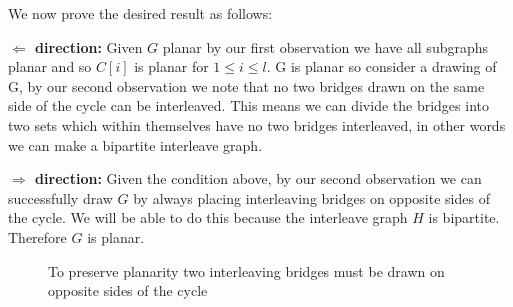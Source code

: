 \documentclass[a4paper]{article}
\begin{document}
\vspace{\baselineskip}
We now prove the desired result as follows:

\vspace{\baselineskip}
\textbf{$\Leftarrow$ direction:} Given $G$ planar by our first observation we have all subgraphs planar and so $C[i]$ is planar for $1 \leq i \leq l$. G is planar so consider a drawing of G, by our second observation we note that no two bridges drawn on the same side of the cycle can be interleaved. This means we can divide the bridges into two sets which within themselves have no two bridges interleaved, in other words we can make a bipartite interleave graph.

\vspace{\baselineskip}
\textbf{$\Rightarrow$ direction:} Given the condition above, by our second observation we can successfully draw $G$ by always placing interleaving bridges on opposite sides of the cycle. We will be able to do this because the interleave graph $H$ is bipartite. Therefore $G$ is planar.

\begin{figure}[H]
    \centering
    \begin{minipage}{0.48\textwidth}
        \centering
    \end{minipage}\hfill
    \begin{minipage}{0.48\textwidth}
        \centering
    \end{minipage}
    \caption{To preserve planarity two interleaving bridges must be drawn on opposite sides of the cycle}
    \label{fig:Q3a}
\end{figure}
\end{document}
